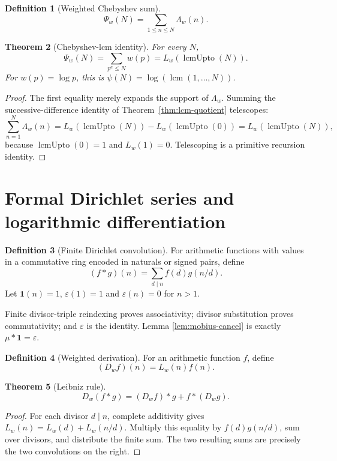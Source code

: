 \documentclass[11pt]{article}
\newtheorem{theorem}{Theorem}[section]
\theoremstyle{definition}
\newtheorem{definition}[theorem]{Definition}
\newcommand{\lcmu}{\operatorname{lcmUpto}}
\begin{document}
\begin{definition}[Weighted Chebyshev sum]
\[
 \Psi_w(N)=\sum_{1\le n\le N}\Lambda_w(n).
\]
\end{definition}

\begin{theorem}[Chebyshev-lcm identity]\label{thm:psi-lcm}
For every \(N\),
\[
 \boxed{\displaystyle
 \Psi_w(N)=\sum_{p^a\le N}w(p)=L_w(\lcmu(N)).}
\]
For \(w(p)=\log p\), this is
\(\psi(N)=\log(\operatorname{lcm}(1,\ldots,N))\).
\end{theorem}

\begin{proof}
The first equality merely expands the support of \(\Lambda_w\).  Summing the
successive-difference identity of Theorem~\ref{thm:lcm-quotient} telescopes:
\[
 \sum_{n=1}^{N}\Lambda_w(n)
 =L_w(\lcmu(N))-L_w(\lcmu(0))=L_w(\lcmu(N)),
\]
because \(\lcmu(0)=1\) and \(L_w(1)=0\).  Telescoping is a primitive
recursion identity.
\end{proof}

\section{Formal Dirichlet series and logarithmic differentiation}

\begin{definition}[Finite Dirichlet convolution]
For arithmetic functions with values in a commutative ring encoded in
naturals or signed pairs, define
\[
 (f*g)(n)=\sum_{d\mid n}f(d)g(n/d).
\]
Let \(\mathbf1(n)=1\), \(\varepsilon(1)=1\) and
\(\varepsilon(n)=0\) for \(n>1\).
\end{definition}

Finite divisor-triple reindexing proves associativity; divisor substitution
proves commutativity; and \(\varepsilon\) is the identity.  Lemma
\ref{lem:mobius-cancel} is exactly \(\mu*\mathbf1=\varepsilon\).

\begin{definition}[Weighted derivation]
For an arithmetic function \(f\), define
\[
 (D_wf)(n)=L_w(n)f(n).
\]
\end{definition}

\begin{theorem}[Leibniz rule]\label{thm:dirichlet-leibniz}
\[
 \boxed{D_w(f*g)=(D_wf)*g+f*(D_wg).}
\]
\end{theorem}

\begin{proof}
For each divisor \(d\mid n\), complete additivity gives
\(L_w(n)=L_w(d)+L_w(n/d)\).  Multiply this equality by
\(f(d)g(n/d)\), sum over divisors, and distribute the finite sum.  The two
resulting sums are precisely the two convolutions on the right.
\end{proof}
\end{document}
